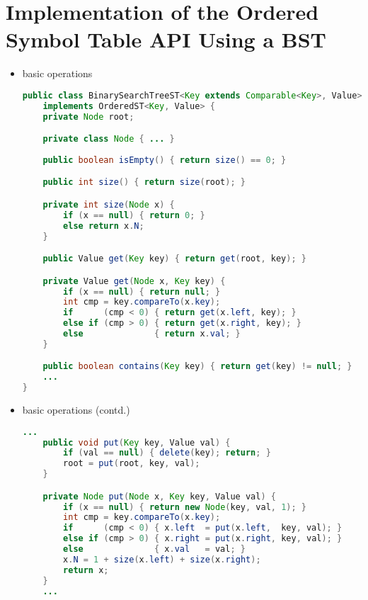 \documentclass[8pt,a4paper,compress]{beamer}
\begin{document}
\section{Implementation of the Ordered Symbol Table API Using a BST}
\begin{frame}[fragile]
\begin{itemize}
\item basic operations
\begin{lstlisting}[language=Java]
public class BinarySearchTreeST<Key extends Comparable<Key>, Value> 
    implements OrderedST<Key, Value> {
    private Node root;

    private class Node { ... }
    
    public boolean isEmpty() { return size() == 0; }

    public int size() { return size(root); }

    private int size(Node x) {
        if (x == null) { return 0; }
        else return x.N;
    }

    public Value get(Key key) { return get(root, key); }

    private Value get(Node x, Key key) {
        if (x == null) { return null; }
        int cmp = key.compareTo(x.key);
        if      (cmp < 0) { return get(x.left, key); }
        else if (cmp > 0) { return get(x.right, key); }
        else              { return x.val; }
    }

    public boolean contains(Key key) { return get(key) != null; }
    ...
}
\end{lstlisting}
\end{itemize}
\end{frame}

\begin{frame}[fragile]
\begin{itemize}
\item basic operations (contd.)
\begin{lstlisting}[language=Java]
    ...
    public void put(Key key, Value val) {
        if (val == null) { delete(key); return; }
        root = put(root, key, val);
    }

    private Node put(Node x, Key key, Value val) {
        if (x == null) { return new Node(key, val, 1); }
        int cmp = key.compareTo(x.key);
        if      (cmp < 0) { x.left  = put(x.left,  key, val); }
        else if (cmp > 0) { x.right = put(x.right, key, val); }
        else              { x.val   = val; }
        x.N = 1 + size(x.left) + size(x.right);
        return x;
    }
    ...
\end{lstlisting}
\end{itemize}
\end{frame}
\end{document}

